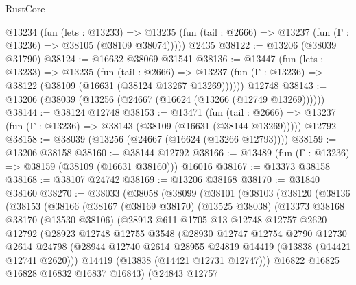 \begin{lexlean}{RustCore}
\begin{coremodule}
    @13234
      (fun (lets : @13233) =>
      @13235 (fun (tail : @2666) => @13237 (fun (Γ : @13236) => @38105 (@38109 @38074)))))
    @2435
@38122 := @13206 (@38039 @31790)
@38124 := @16632 @38069 @31541
@38136 := @13447
    (fun (lets : @13233) =>
    @13235
      (fun (tail : @2666) =>
      @13237 (fun (Γ : @13236) => @38122 (@38109 (@16631 (@38124 @13267 @13269))))))
    @12748
@38143 := @13206 (@38039 (@13256 (@24667 (@16624 (@13266 (@12749 @13269))))))
@38144 := @38124 @12748
@38153 := @13471
    (fun (tail : @2666) => @13237 (fun (Γ : @13236) => @38143 (@38109 (@16631 (@38144 @13269)))))
    @12792
@38158 := @38039 (@13256 (@24667 (@16624 (@13266 @12793))))
@38159 := @13206 @38158
@38160 := @38144 @12792
@38166 := @13489 (fun (Γ : @13236) => @38159 (@38109 (@16631 @38160))) @16016
@38167 := @13373 @38158
@38168 := @38107 @24742
@38169 := @13206 @38168
@38170 := @31840 @38160
@38270 := @38033
    (@38058
      (@38099
        (@38101
          (@38103
            (@38120
              (@38136
                (@38153
                  (@38166
                    (@38167
                      (@38169 @38170)
                      (@13525 @38038)
                      (@13373
                        @38168
                        @38170
                        (@13530 @38106)
                        (@28913
                          @611
                          @1705
                          @13
                          @12748
                          @12757
                          @2620
                          @12792
                          (@28923
                            @12748
                            @12755
                            @3548
                            (@28930
                              @12747
                              @12754
                              @2790
                              @12730
                              @2614
                              @24798
                              (@28944
                                @12740
                                @2614
                                @28955
                                @24819
                                @14419
                                (@13838 (@14421 @12741 @2620)))
                              @14419
                              (@13838 (@14421 @12731 @12747)))
                            @16822
                            @16825
                            @16828
                            @16832
                            @16837
                            @16843)
                          (@24843
                            @12757

\end{coremodule}
\end{lexlean}
